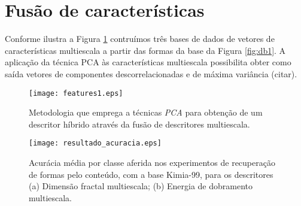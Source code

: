  

\section{Fusão de características}

Conforme ilustra a Figura \ref{fig:features1} contruímos três bases de dados de vetores de características multiescala a partir das formas da base da Figura \ref{fig:db1}. A aplicação da técnica PCA às características multiescala possibilita obter como saída vetores de componentes descorrelacionadas e de máxima variância (citar). 

\begin{figure}[h!]
  \caption{\label{fig:features1} Metodologia que emprega a técnicas \emph{PCA} para obtenção de um descritor híbrido através da fusão de descritores multiescala.}
  \centering
  \texttt{[image: features1.eps]}
\end{figure}

\begin{figure}[h!]
  \caption{\label{fig:acuracia} Acurácia média por classe aferida nos experimentos de recuperação de formas pelo conteúdo, com a base Kimia-99, para os descritores (a) Dimensão fractal multiescala; (b) Energia de dobramento multiescala.}
  \centering
  \texttt{[image: resultado\_acuracia.eps]}
\end{figure}


\color{black}
\begin{comment}
\section{Bases de imagens}
\end{comment}
\begin{comment}
\begin{figure}
\centering
\caption{\label{Met:1}Metodologia 1}
\texttt{[image: Metodologia1.eps]}
\end{figure}

\begin{figure}
\centering
\caption{\label{Met:2}Metodologia 2}
\texttt{[image: figura\_metodo.eps]}
\end{figure}
\end{comment}